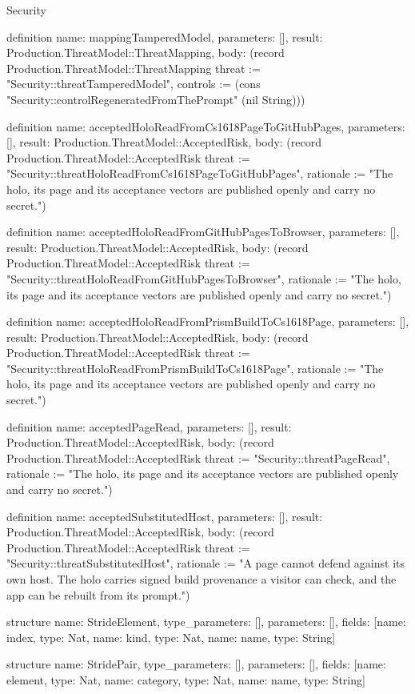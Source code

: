 \begin{lexlean}{Security}
\begin{semanticmodule}
definition{
  name: mappingTamperedModel,
  parameters: [],
  result: Production.ThreatModel::ThreatMapping,
  body: (record Production.ThreatModel::ThreatMapping {threat := "Security::threatTamperedModel", controls := (cons "Security::controlRegeneratedFromThePrompt" (nil String))})
}

definition{
  name: acceptedHoloReadFromCs1618PageToGitHubPages,
  parameters: [],
  result: Production.ThreatModel::AcceptedRisk,
  body: (record Production.ThreatModel::AcceptedRisk {threat := "Security::threatHoloReadFromCs1618PageToGitHubPages", rationale := "The holo, its page and its acceptance vectors are published openly and carry no secret."})
}

definition{
  name: acceptedHoloReadFromGitHubPagesToBrowser,
  parameters: [],
  result: Production.ThreatModel::AcceptedRisk,
  body: (record Production.ThreatModel::AcceptedRisk {threat := "Security::threatHoloReadFromGitHubPagesToBrowser", rationale := "The holo, its page and its acceptance vectors are published openly and carry no secret."})
}

definition{
  name: acceptedHoloReadFromPrismBuildToCs1618Page,
  parameters: [],
  result: Production.ThreatModel::AcceptedRisk,
  body: (record Production.ThreatModel::AcceptedRisk {threat := "Security::threatHoloReadFromPrismBuildToCs1618Page", rationale := "The holo, its page and its acceptance vectors are published openly and carry no secret."})
}

definition{
  name: acceptedPageRead,
  parameters: [],
  result: Production.ThreatModel::AcceptedRisk,
  body: (record Production.ThreatModel::AcceptedRisk {threat := "Security::threatPageRead", rationale := "The holo, its page and its acceptance vectors are published openly and carry no secret."})
}

definition{
  name: acceptedSubstitutedHost,
  parameters: [],
  result: Production.ThreatModel::AcceptedRisk,
  body: (record Production.ThreatModel::AcceptedRisk {threat := "Security::threatSubstitutedHost", rationale := "A page cannot defend against its own host. The holo carries signed build provenance a visitor can check, and the app can be rebuilt from its prompt."})
}

structure{
  name: StrideElement,
  type_parameters: [],
  parameters: [],
  fields: [{name: index, type: Nat}, {name: kind, type: Nat}, {name: name, type: String}]
}

structure{
  name: StridePair,
  type_parameters: [],
  parameters: [],
  fields: [{name: element, type: Nat}, {name: category, type: Nat}, {name: name, type: String}]
}


\end{semanticmodule}
\end{lexlean}
